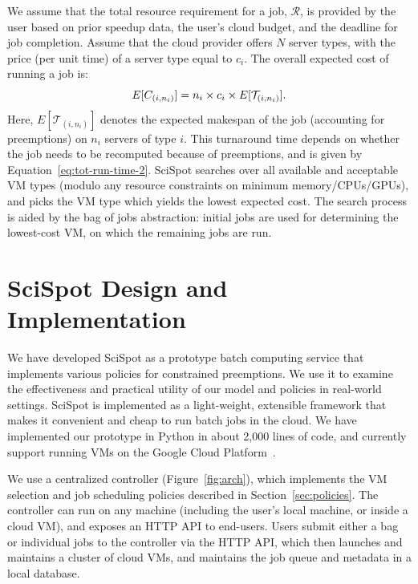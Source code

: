 \documentclass[compsoc]{IEEEtran}
\newcommand{\sysname}{SciSpot\xspace}
\newcommand{\eqnspace}[0]{-0.1cm}
\begin{document}
We assume that the total resource requirement for a job, $\mathcal{R}$, is provided by the user based on prior speedup data, the user's cloud budget, and the deadline for job completion.
Assume that the cloud provider offers $N$ server types, with the price (per unit time) of a server type equal to $c_i$. 
The overall expected cost of running a job is: 
\begin{equation}
  \label{eq:e-cost}
\vspace*{\eqnspace}
  E[C_{( i,n_i )}] = n_i\times c_i \times E[\mathcal{T}_{( i,n_i )}].
\end{equation}
Here, $E[\mathcal{T}_{( i,n_i )}]$ denotes the expected makespan of the job (accounting for preemptions) on $n_i$ servers of type $i$. 
This turnaround time depends on whether the job needs to be recomputed because of preemptions, and is given by Equation~\ref{eq:tot-run-time-2}. 
\sysname searches over all available and acceptable VM types (modulo any resource constraints on minimum memory/CPUs/GPUs), and picks the VM type which yields the lowest expected cost.
The search process is aided by the bag of jobs abstraction: initial jobs are used for determining the lowest-cost VM, on which the remaining jobs are run. 









 


\section{SciSpot Design and Implementation}
\label{sec:impl}

We have developed \sysname as a prototype batch computing service that implements various policies for constrained preemptions. 
We use it to examine the effectiveness and practical utility of our model and policies in real-world settings. 
\sysname is implemented as a light-weight, extensible framework that makes it convenient and cheap to run batch jobs in the cloud. 
We have implemented our prototype in Python in about 2,000 lines of code, and currently support running VMs on the Google Cloud Platform~\cite{gcp}. 


We use a centralized controller (Figure~\ref{fig:arch}), which implements the VM selection and job scheduling policies described in Section~\ref{sec:policies}. 
The controller can run on any machine (including the user's local machine, or inside a cloud VM), and exposes an HTTP API to end-users. 
Users submit either a bag or individual jobs to the controller via the HTTP API, which then launches and maintains a cluster of cloud VMs, and maintains the job queue and metadata in a local database. 
\end{document}
